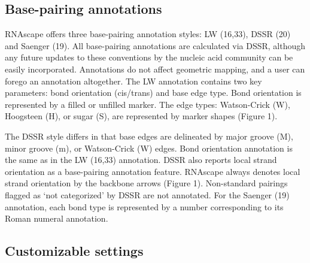 \subsection{Base-pairing annotations}

RNAscape offers three base-pairing annotation styles: LW (16,33), DSSR (20) and Saenger (19). All base-pairing annotations are calculated via DSSR, although any future updates to these conventions by the nucleic acid community can be easily incorporated. Annotations do not affect geometric mapping, and a user can forego an annotation altogether. The LW annotation contains two key parameters: bond orientation (cis/trans) and base edge type. Bond orientation is represented by a filled or unfilled marker. The edge types: Watson-Crick (W), Hoogsteen (H), or sugar (S), are represented by marker shapes (Figure 1).

The DSSR style differs in that base edges are delineated by major groove (M), minor groove (m), or Watson-Crick (W) edges. Bond orientation annotation is the same as in the LW (16,33) annotation. DSSR also reports local strand orientation as a base-pairing annotation feature. RNAscape always denotes local strand orientation by the backbone arrows (Figure 1). Non-standard pairings flagged as ‘not categorized’ by DSSR are not annotated. For the Saenger (19) annotation, each bond type is represented by a number corresponding to its Roman numeral annotation.

\subsection{Customizable settings}

